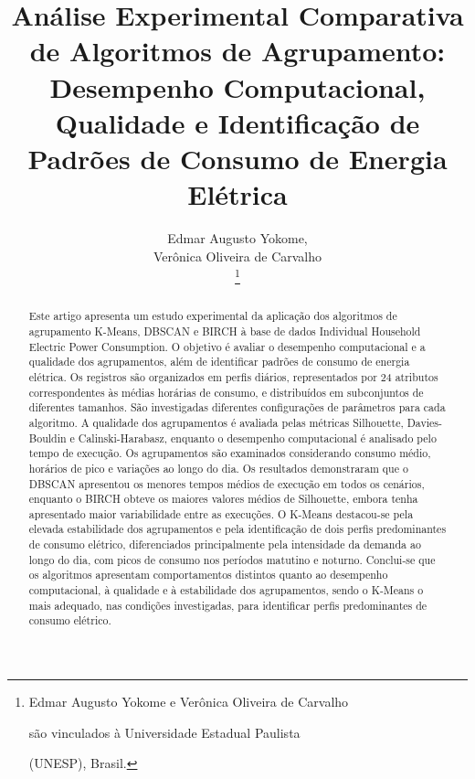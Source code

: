 \documentclass[lettersize,journal]{IEEEtran}
\begin{document}
\title{
{\fontsize{18}{21}\selectfont
Análise Experimental Comparativa de Algoritmos de
Agrupamento: Desempenho Computacional, Qualidade e
Identificação de Padrões de Consumo de Energia Elétrica}
}

\author{

Edmar Augusto Yokome,

Verônica Oliveira de Carvalho%

\thanks{

Edmar Augusto Yokome e Verônica Oliveira de Carvalho

são vinculados à Universidade Estadual Paulista

(UNESP), Brasil.

}

}





\maketitle

\begin{abstract}

Este artigo apresenta um estudo experimental da aplicação dos algoritmos de agrupamento K-Means, DBSCAN e BIRCH à base de dados Individual Household Electric Power Consumption. O objetivo é avaliar o desempenho computacional e a qualidade dos agrupamentos, além de identificar padrões de consumo de energia elétrica. Os registros são organizados em perfis diários, representados por 24 atributos correspondentes às médias horárias de consumo, e distribuídos em subconjuntos de diferentes tamanhos. São investigadas diferentes configurações de parâmetros para cada algoritmo. A qualidade dos agrupamentos é avaliada pelas métricas Silhouette, Davies-Bouldin e Calinski-Harabasz, enquanto o desempenho computacional é analisado pelo tempo de execução. Os agrupamentos são examinados considerando consumo médio, horários de pico e variações ao longo do dia. Os resultados demonstraram que o DBSCAN apresentou os menores tempos médios de execução em todos os cenários, enquanto o BIRCH obteve os maiores valores médios de Silhouette, embora tenha apresentado maior variabilidade entre as execuções. O K-Means destacou-se pela elevada estabilidade dos agrupamentos e pela identificação de dois perfis predominantes de consumo elétrico, diferenciados principalmente pela intensidade da demanda ao longo do dia, com picos de consumo nos períodos matutino e noturno. Conclui-se que os algoritmos apresentam comportamentos distintos quanto ao desempenho computacional, à qualidade e à estabilidade dos agrupamentos, sendo o K-Means o mais adequado, nas condições investigadas, para identificar perfis predominantes de consumo elétrico.

\end{abstract}
\end{document}

